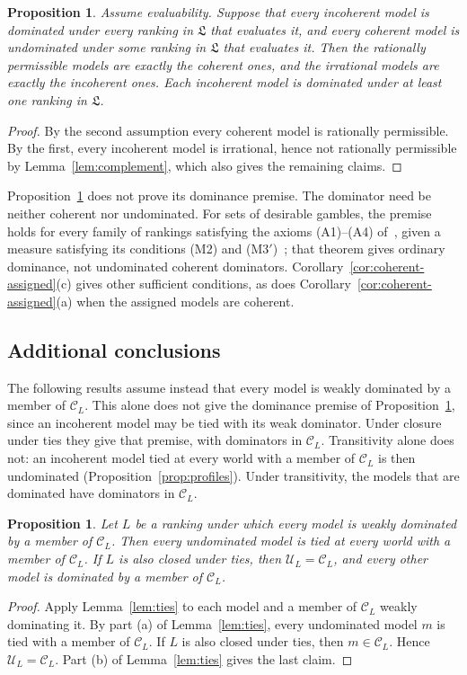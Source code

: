 \documentclass[11pt]{article}
\newtheorem{proposition}[theorem]{Proposition}
\theoremstyle{definition}
\newcommand{\C}{\mathcal C}
\newcommand{\U}{\mathcal U}
\newcommand{\Lf}{\mathfrak L}
\begin{document}
\begin{proposition}\label{prop:family}
Assume evaluability. Suppose that every incoherent model is dominated under every ranking in $\Lf$ that evaluates it, and every coherent model is undominated under some ranking in $\Lf$ that evaluates it. Then the rationally permissible models are exactly the coherent ones, and the irrational models are exactly the incoherent ones. Each incoherent model is dominated under at least one ranking in $\Lf$.
\end{proposition}
\begin{proof}
By the second assumption every coherent model is rationally permissible. By the first, every incoherent model is irrational, hence not rationally permissible by Lemma~\ref{lem:complement}, which also gives the remaining claims.
\end{proof}

Proposition~\ref{prop:family} does not prove its dominance premise. The dominator need be neither coherent nor undominated. For sets of desirable gambles, the premise holds for every family of rankings satisfying the axioms (A1)--(A4) of~\cite{KCM}, given a measure satisfying its conditions (M2) and (M3$'$)~\cite[Theorem~4.1]{KCM}; that theorem gives ordinary dominance, not undominated coherent dominators. Corollary~\ref{cor:coherent-assigned}(c) gives other sufficient conditions, as does Corollary~\ref{cor:coherent-assigned}(a) when the assigned models are coherent.

\subsection{Additional conclusions}
The following results assume instead that every model is weakly dominated by a member of $\C_L$. This alone does not give the dominance premise of Proposition~\ref{prop:family}, since an incoherent model may be tied with its weak dominator. Under closure under ties they give that premise, with dominators in $\C_L$. Transitivity alone does not: an incoherent model tied at every world with a member of $\C_L$ is then undominated (Proposition~\ref{prop:profiles}). Under transitivity, the models that are dominated have dominators in $\C_L$.

\begin{proposition}\label{prop:conclusion}
Let $L$ be a ranking under which every model is weakly dominated by a member of $\C_L$. Then every undominated model is tied at every world with a member of $\C_L$. If $L$ is also closed under ties, then $\U_L=\C_L$, and every other model is dominated by a member of $\C_L$.
\end{proposition}
\begin{proof}
Apply Lemma~\ref{lem:ties} to each model and a member of $\C_L$ weakly dominating it. By part (a) of Lemma~\ref{lem:ties}, every undominated model $m$ is tied with a member of $\C_L$. If $L$ is also closed under ties, then $m\in\C_L$. Hence $\U_L=\C_L$. Part (b) of Lemma~\ref{lem:ties} gives the last claim.
\end{proof}
\end{document}
